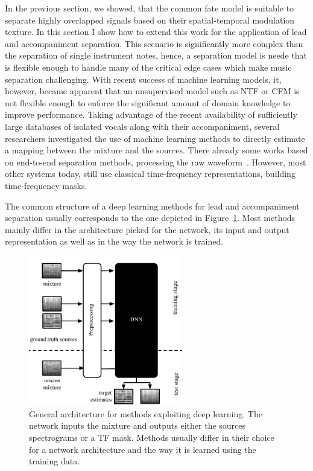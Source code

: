 In the previous section, we showed, that the common fate model is suitable to separate highly overlapped signals based on their spatial-temporal modulation texture.
In this section I show how to extend this work for the application of lead  and accompaniment separation.
This scenario is significantly more complex than the separation of single instrument notes, hence, a separation model is neede that is flexible enough to handle many of the critical edge cases which make music separation challenging.
With recent success of machine learning models, it, however, became apparent that an unsupervised model such as NTF or CFM is not flexible enough to enforce the significant amount of domain knowledge to improve performance.
Taking advantage of the recent availability of sufficiently large databases of isolated vocals along with their accompaniment, several researchers investigated the use of machine learning methods to directly estimate a mapping between the mixture and the sources.
There already some works based on end-to-end separation methods, processing the raw waveform~\cite{venkataramani17}.
However, most other systems today, still use classical time-frequency representations, building time-frequency masks.
\par
The common structure of a deep learning methods for lead and accompaniment separation usually corresponds to the one depicted in Figure~\ref{fig:methods_dnn}.
Most methods mainly differ in the architecture picked for the network, its input and output representation as well as in the way the network is trained.

\begin{figure}
  \centering
  \includegraphics[width=0.6\textwidth]{Chapters/06_Separation_Unknown/figures/methods_dnn.pdf}
  \caption{General architecture for methods exploiting deep learning. The network inputs the mixture and outputs either the sources spectrograms or a TF mask. Methods usually differ in their choice for a network architecture and the way it is learned using the training data.}
  \label{fig:methods_dnn}
\end{figure}

